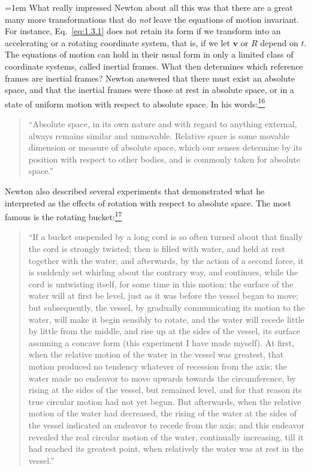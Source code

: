 \begingroup
\emergencystretch=1em
What really impressed Newton about all this was that there are a great many
more transformations that do \emph{not} leave the equations of motion
invariant. For instance, Eq.~\eqref{eq:1.3.1} does not retain its form if we
transform into an accelerating or a rotating coordinate system, that is, if
we let \(\mathbf v\) or \(R\) depend on \(t\). The equations of motion can
hold in their usual form in only a limited class of coordinate systems, called
inertial frames. What then determines which reference frames are inertial
frames? Newton answered that there must exist an absolute space, and that the
inertial frames were those at rest in absolute space, or in a state of uniform
motion with respect to absolute space. In his
words:\hyperref[ch1-ref-16]{\textsuperscript{16}}
\par
\endgroup

\begin{quote}
``Absolute space, in its own nature and with regard to anything external,
always remains similar and unmovable. Relative space is some movable dimension
or measure of absolute space, which our senses determine by its position with
respect to other bodies, and is commonly taken for absolute space.''
\end{quote}

Newton also described several experiments that demonstrated what he
interpreted as the effects of rotation with respect to absolute space. The most
famous is the rotating bucket:\hyperref[ch1-ref-17]{\textsuperscript{17}}

\begin{quote}
``If a bucket suspended by a long cord is so often turned about that finally
the cord is strongly twisted; then is filled with water, and held at rest
together with the water; and afterwards, by the action of a second force, it
is suddenly set whirling about the contrary way, and continues, while the cord
is untwisting itself, for some time in this motion; the surface of the water
will at first be level, just as it was before the vessel began to move; but
subsequently, the vessel, by gradually communicating its motion to the water,
will make it begin sensibly to rotate, and the water will recede little by
little from the middle, and rise up at the sides of the vessel, its surface
assuming a concave form (this experiment I have made myself). At first, when
the relative motion of the water in the vessel was greatest, that motion
produced no tendency whatever of recession from the axis; the water made no
endeavor to move upwards towards the circumference, by rising at the sides of
the vessel, but remained level, and for that reason its true circular motion
had not yet begun. But afterwards, when the relative motion of the water had
decreased, the rising of the water at the sides of the vessel indicated an
endeavor to recede from the axis; and this endeavor revealed the real circular
motion of the water, continually increasing, till it had reached its greatest
point, when relatively the water was at rest in the vessel.''
\end{quote}

